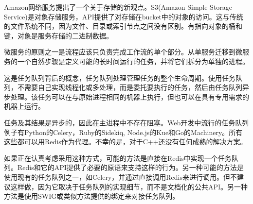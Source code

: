 Amazon网络服务提出了一个关于存储的新观点。S3(Amazon Simple Storage Service)是对象存储服务，API提供了对存储在bucket中的对象的访问。这与传统的文件系统不同，因为文件、目录或索引节点之间没有区别。有指向对象的桶和键，对象是服务存储的二进制数据。


微服务的原则之一是流程应该只负责完成工作流的单个部分。从单服务迁移到微服务的一个自然步骤是定义可能的长时间运行的任务，并将它们拆分为单独的进程。

这是任务队列背后的概念，任务队列处理管理任务的整个生命周期。使用任务队列，不需要自己实现线程化或多处理，而是委托要执行的任务，然后由任务队列异步处理。该任务可以在与原始进程相同的机器上执行，但也可以在具有专用需求的机器上运行。

任务及其结果是异步的，因此在主进程中不存在阻塞。Web开发中流行的任务队列例子有Python的Celery，Ruby的Sidekiq, Node.js的Kue和Go的Machinery。所有这些都可以用Redis作为代理。不幸的是，对于C++还没有任何成熟的解决方案。

如果正在认真考虑采用这种方式，可能的方法是直接在Redis中实现一个任务队列。Redis和它的API提供了必要的原语来支持这样的行为。另一种可能的方法是使用现有的任务队列之一，如Celery，并通过直接调用Redis来进行调用。但不建议这样做，因为它取决于任务队列的实现细节，而不是文档化的公共API。另一种方法是使用SWIG或类似方法提供的绑定来对接任务队列。



















